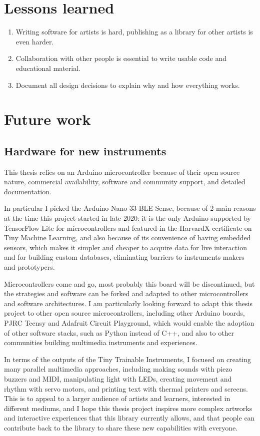 \section{Lessons learned}

\begin{enumerate}
  \item Writing software for artists is hard, publishing as a library for other artists is even harder.
  \item Collaboration with other people is essential to write usable code and educational material.
  \item Document all design decisions to explain why and how everything works.
\end{enumerate}

\section{Future work}

\subsection{Hardware for new instruments}

This thesis relies on an Arduino microcontroller because of their open source nature, commercial availability, software and community support, and detailed documentation.

In particular I picked the Arduino Nano 33 BLE Sense, because of 2 main reasons at the time this project started in late 2020: it is the only Arduino supported by TensorFlow Lite for microcontrollers and featured in the HarvardX certificate on Tiny Machine Learning, and also because of its convenience of having embedded sensors, which makes it simpler and cheaper to acquire data for live interaction and for building custom databases, eliminating barriers to instruments makers and prototypers.

Microcontrollers come and go, most probably this board will be discontinued, but the strategies and software can be forked and adapted to other microcontrollers and software architectures. I am particularly looking forward to adapt this thesis project to other open source microcontrollers, including other Arduino boards, PJRC Teensy and Adafruit Circuit Playground, which would enable the adoption of other software stacks, such as Python instead of C++, and also to other communities building multimedia instruments and experiences.

In terms of the outputs of the Tiny Trainable Instruments, I focused on creating many parallel multimedia approaches, including making sounds with piezo buzzers and MIDI, manipulating light with LEDs, creating movement and rhythm with servo motors, and printing text with thermal printers and screens. This is to appeal to a larger audience of artists and learners, interested in different mediums, and I hope this thesis project inspires more complex artworks and interactive experiences that this library currently allows, and that people can contribute back to the library to share these new capabilities with everyone.

